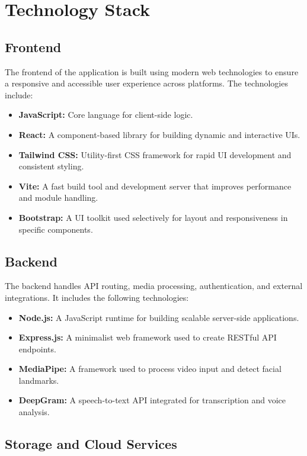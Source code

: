 \documentclass{article}
\begin{document}
\section{Technology Stack}

\subsection{Frontend}
The frontend of the application is built using modern web technologies to ensure a responsive and accessible user experience across platforms. The technologies include:
\begin{itemize}
    \item \textbf{JavaScript:} Core language for client-side logic.
    \item \textbf{React:}  A component-based library for building dynamic and interactive UIs.
    \item \textbf{Tailwind CSS:} Utility-first CSS framework for rapid UI development and consistent styling.
    \item \textbf{Vite:} A fast build tool and development server that improves performance and module handling.
    \item \textbf{Bootstrap:} A UI toolkit used selectively for layout and responsiveness in specific components.
\end{itemize}

\subsection{Backend}
The backend handles API routing, media processing, authentication, and external integrations. It includes the following technologies:
\begin{itemize}
    \item \textbf{Node.js:} A JavaScript runtime for building scalable server-side applications.
    \item \textbf{Express.js:} A minimalist web framework used to create RESTful API endpoints.
    \item \textbf{MediaPipe:} A framework used to process video input and detect facial landmarks.
    \item \textbf{DeepGram:} A speech-to-text API integrated for transcription and voice analysis.
\end{itemize}

\subsection{Storage and Cloud Services}
\end{document}
